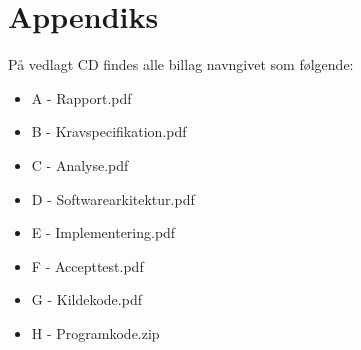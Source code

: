 \documentclass[rapport.tex]{subfiles}
\begin{document}
\section{Appendiks}	
På vedlagt CD findes alle billag navngivet som følgende:
	\begin{itemize}
		\item A - Rapport.pdf
		\item B - Kravspecifikation.pdf
		\item C - Analyse.pdf
		\item D - Softwarearkitektur.pdf
		\item E - Implementering.pdf
		\item F - Accepttest.pdf
		\item G - Kildekode.pdf
		\item H - Programkode.zip
	\end{itemize}

		
\end{document}
